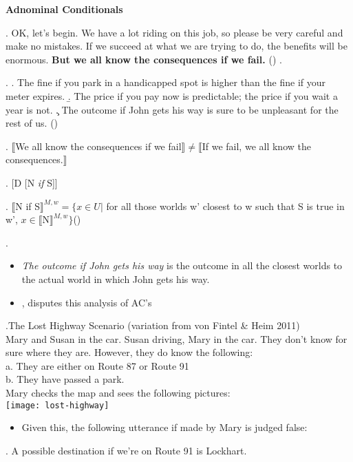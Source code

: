 \documentclass[letterpaper]{article}
\begin{document}
\begin{center}
	\textbf{Adnominal Conditionals}
\end{center}
\ex. OK, let's begin.
We have a lot riding on this job, so please be very careful and make no mistakes.
If we succeed at what we are trying to do, the benefits will be enormous.
\textbf{But we all know the consequences if we fail.} \hfill (\cite{lasersohn1996adnominal})
\z.

\ex.
\a. The fine if you park in a handicapped spot is higher than the fine if your
meter expires.
\b. The price if you pay now is predictable; the price if you wait a year is not.
\c. The outcome if John gets his way is sure to be unpleasant for the rest of
us. \hfill (\cite{lasersohn1996adnominal})

\ex. $\llbracket$We all know the consequences if we fail$\rrbracket \neq \llbracket$If we fail, we all know the consequences.$\rrbracket$

\ex. [D [N \textit{if} S]]

\ex. $\llbracket$N if S$\rrbracket^{M,w} = \{x \in U |$ for all those worlds w' closest to w such that S is true in w', $x \in \llbracket$N$\rrbracket^{M,w}\}$\hfill(\cite{lasersohn1996adnominal})

\ex. 

\begin{itemize}
	\item \textit{The outcome if John gets his way} is the outcome in all the closest worlds to the actual world in which John gets his way.
	\item \textcite{franaappearmodality}, disputes this analysis of AC's
\end{itemize}
\ex.The Lost Highway Scenario (variation from von Fintel \& Heim 2011)\\
Mary and Susan in the car. Susan driving, Mary in the car. They don’t know for sure where they are. However, they do know the following:\\
a. They are either on Route 87 or Route 91\\
b. They have passed a park.\\
Mary checks the map and sees the following pictures:\\
\texttt{[image: lost-highway]}

\begin{itemize}
	\item Given this, the following utterance if made by Mary is judged false:
\end{itemize}
\ex. A possible destination if we're on Route 91 is Lockhart.
\end{document}
